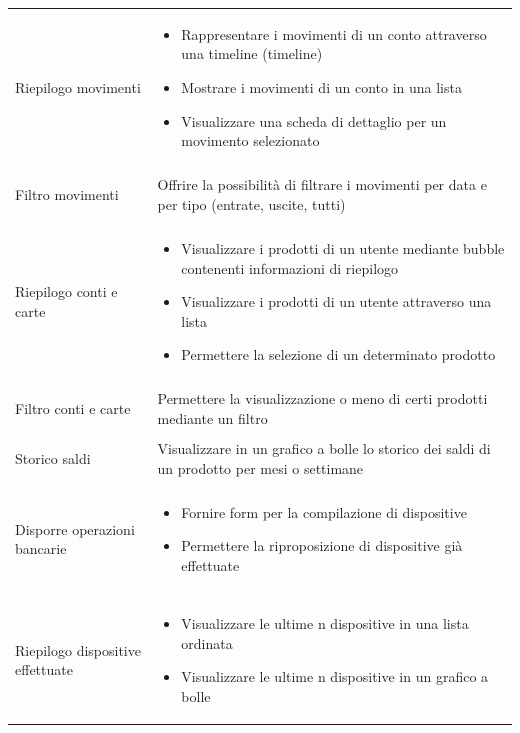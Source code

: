 \begin{center}
\begin{longtable}{p{6cm}|p{8cm}}
    Riepilogo movimenti & \begin{itemize}
                           \item Rappresentare i movimenti di un conto attraverso una timeline (timeline)
                           \item Mostrare i movimenti di un conto in una lista
                           \item Visualizzare una scheda di dettaglio per un movimento selezionato
                          \end{itemize}\\\\
    Filtro movimenti & Offrire la possibilità di filtrare i movimenti per data e per tipo (entrate, uscite, tutti)\\\\
    Riepilogo conti e carte & \begin{itemize}
				\item Visualizzare i prodotti di un utente mediante bubble contenenti informazioni di riepilogo
				\item Visualizzare i prodotti di un utente attraverso una lista
				\item Permettere la selezione di un determinato prodotto
                              \end{itemize}\\\\
    Filtro conti e carte & Permettere la visualizzazione o meno di certi prodotti mediante un filtro\\\\
    Storico saldi & Visualizzare in un grafico a bolle lo storico dei saldi di un prodotto per mesi o settimane \\\\
    Disporre operazioni bancarie & \begin{itemize}
				      \item Fornire form per la compilazione di dispositive 
				      \item Permettere la riproposizione di dispositive già effettuate
				    \end{itemize}\\\\
    Riepilogo dispositive effettuate & \begin{itemize}
                                        \item Visualizzare le ultime n dispositive in una lista ordinata
                                        \item Visualizzare le ultime n dispositive in un grafico a bolle

\end{itemize}
\end{longtable}
\end{center}
